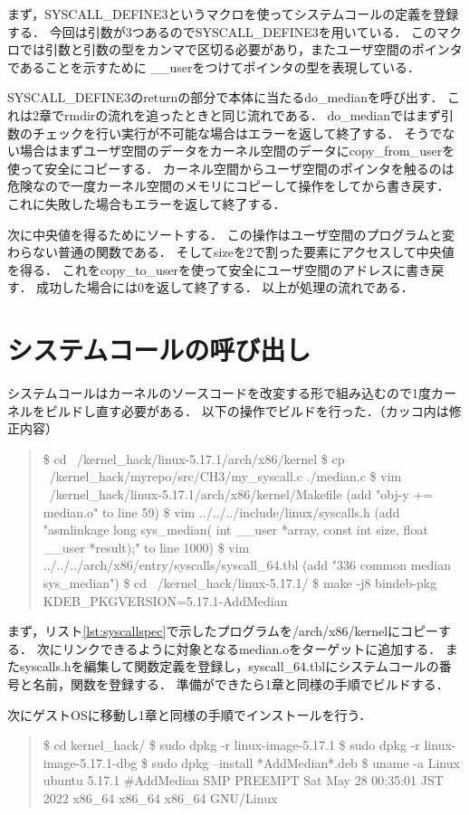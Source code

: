 まず，SYSCALL_DEFINE3というマクロを使ってシステムコールの定義を登録する．
今回は引数が3つあるのでSYSCALL_DEFINE3を用いている．
このマクロでは引数と引数の型をカンマで区切る必要があり，またユーザ空間のポインタであることを示すために
__userをつけてポインタの型を表現している．

SYSCALL_DEFINE3のreturnの部分で本体に当たるdo_medianを呼び出す．
これは2章でrmdirの流れを追ったときと同じ流れである．
do_medianではまず引数のチェックを行い実行が不可能な場合はエラーを返して終了する．
そうでない場合はまずユーザ空間のデータをカーネル空間のデータにcopy_from_userを使って安全にコピーする．
カーネル空間からユーザ空間のポインタを触るのは危険なので一度カーネル空間のメモリにコピーして操作をしてから書き戻す．
これに失敗した場合もエラーを返して終了する．

次に中央値を得るためにソートする．
この操作はユーザ空間のプログラムと変わらない普通の関数である．
そしてsizeを2で割った要素にアクセスして中央値を得る．
これをcopy_to_userを使って安全にユーザ空間のアドレスに書き戻す．
成功した場合には0を返して終了する．
以上が処理の流れである．

\section{システムコールの呼び出し}
システムコールはカーネルのソースコードを改変する形で組み込むので1度カーネルをビルドし直す必要がある．
以下の操作でビルドを行った．（カッコ内は修正内容）
\begin{quote}
\$ cd ~/kernel_hack/linux-5.17.1/arch/x86/kernel
\$ cp ~/kernel_hack/myrepo/src/CH3/my_syscall.c  ./median.c
\$ vim ~/kernel_hack/linux-5.17.1/arch/x86/kernel/Makefile (add "obj-y           += median.o" to line 59)
\$ vim ../../../include/linux/syscalls.h (add "asmlinkage long sys_median( int __user *array, const int size, float __user *result);" to line 1000)
\$ vim ../../../arch/x86/entry/syscalls/syscall_64.tbl (add "336 common  median         sys_median")
\$ cd ~/kernel_hack/linux-5.17.1/
\$ make -j8 bindeb-pkg  KDEB_PKGVERSION=5.17.1-AddMedian
\end{quote}

まず，リスト\ref{lst:syscallspec}で示したプログラムを/arch/x86/kernelにコピーする．
次にリンクできるように対象となるmedian.oをターゲットに追加する．
またsyscalls.hを編集して関数定義を登録し，syscall_64.tblにシステムコールの番号と名前，関数を登録する．
準備ができたら1章と同様の手順でビルドする．

次にゲストOSに移動し1章と同様の手順でインストールを行う．
\begin{quote}
\$ cd kernel_hack/
\$ sudo dpkg -r linux-image-5.17.1
\$ sudo dpkg -r linux-image-5.17.1-dbg
\$ sudo dpkg --install *AddMedian*.deb
\$ uname -a
Linux ubuntu 5.17.1 #AddMedian SMP PREEMPT Sat May 28 00:35:01 JST 2022 x86_64 x86_64 x86_64 GNU/Linux
\end{quote}

